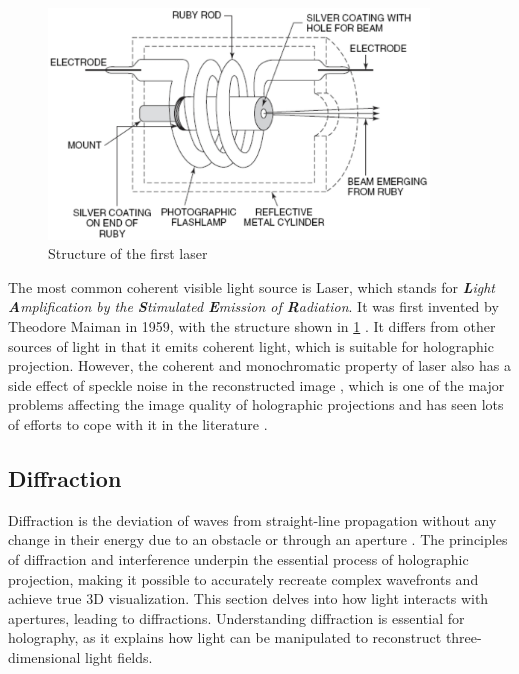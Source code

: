 \begin{figure}[H]
	\centering
	\includegraphics[width=0.9\textwidth]{first_laser.jpg}
	\caption{Structure of the first laser \cite{Hecht2008}}
	\label{fig:first_laser}
\end{figure}

The most common coherent visible light source is Laser, which stands for \textit{\textbf{L}ight \textbf{A}mplification by the \textbf{S}timulated \textbf{E}mission of \textbf{R}adiation}. It was first invented by Theodore Maiman in 1959, with the structure shown in \cref{fig:first_laser} \cite{Hecht2008, Gordon1959, Cartlidge2007}. It differs from other sources of light in that it emits coherent light, which is suitable for holographic projection. However, the coherent and monochromatic property of laser also has a side effect of speckle noise in the reconstructed image \cite{John1966}, which is one of the major problems affecting the image quality of holographic projections and has seen lots of efforts to cope with it in the literature \cite{Cable2004,Stangner2017,Deng2021,Hands2022}.


\subsection{Diffraction} \label{sec:Diffraction}

Diffraction is the deviation of waves from straight-line propagation without any change in their energy due to an obstacle or through an aperture \cite{Hecht2017}. The principles of diffraction and interference underpin the essential process of holographic projection, making it possible to accurately recreate complex wavefronts and achieve true 3D visualization. This section delves into how light interacts with apertures, leading to diffractions. Understanding diffraction is essential for holography, as it explains how light can be manipulated to reconstruct three-dimensional light fields. 

